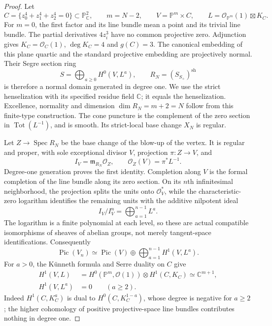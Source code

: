 \begin{proof}
Let
\[
 C=\{z_0^4+z_1^4+z_2^4=0\}\subset\mathbb P^2_{\mathbb C},
 \qquad m=N-2,\qquad V=\mathbb P^m\times C,
 \qquad L=\mathcal O_{\mathbb P^m}(1)\boxtimes K_C.
\]
For $m=0$, the first factor and its line bundle mean a
point and its trivial line bundle. The partial derivatives
$4z_i^3$ have no common projective zero. Adjunction gives
$K_C=\mathcal O_C(1)$, $\deg K_C=4$ and $g(C)=3$.
The canonical embedding of this plane quartic and the
standard projective embedding are projectively normal.
Their Segre section ring
\[
 S=\bigoplus_{a\ge0}H^0(V,L^a),\qquad
 R_N=(S_{S_+})^{\mathrm{sh}}
\]
is therefore a normal domain generated in degree one.
We use the strict henselization with its specified residue
field $\mathbb C$; it equals the henselization. Excellence,
normality and dimension $\dim R_N=m+2=N$ follow from
this finite-type construction. The cone puncture is the
complement of the zero section in $\operatorname{Tot}(L^{-1})$,
and is smooth. Its strict-local base change $X_N$ is regular.

Let $Z\to\operatorname{Spec}R_N$ be the base change of the
blow-up of the vertex. It is regular and proper, with sole
exceptional divisor $V$, projection $\pi:Z\to V$, and
\[
 I_V=\mathfrak m_{R_N}\mathcal O_Z,
 \qquad \mathcal O_Z(V)=\pi^*L^{-1}.
\]
Degree-one generation proves the first identity. Completion
along $V$ is the formal completion of the line bundle along
its zero section. On its $n$th infinitesimal neighborhood,
the projection splits the units onto $\mathcal O_V^*$,
while the characteristic-zero logarithm identifies the
remaining units with the additive nilpotent ideal
\[
 I_V/I_V^n=\bigoplus_{a=1}^{n-1}L^a.
\]
The logarithm is a finite polynomial at each level, so
these are actual compatible isomorphisms of sheaves of
abelian groups, not merely tangent-space identifications.
Consequently
\[
 \operatorname{Pic}(V_n)
 \simeq\operatorname{Pic}(V)\oplus
                   \bigoplus_{a=1}^{n-1}H^1(V,L^a).
\]
For $a>0$, the K\"unneth formula and Serre duality on $C$
give
\begin{align*}
 H^1(V,L)&=H^0(\mathbb P^m,\mathcal O(1))
                         \otimes H^1(C,K_C)
                  \simeq\mathbb C^{m+1},\\
 H^1(V,L^a)&=0\qquad(a\ge2).
\end{align*}
Indeed $H^1(C,K_C^a)$ is dual to
$H^0(C,K_C^{1-a})$, whose degree is negative for $a\ge2$;
the higher cohomology of positive projective-space line
bundles contributes nothing in degree one.


\end{proof}
